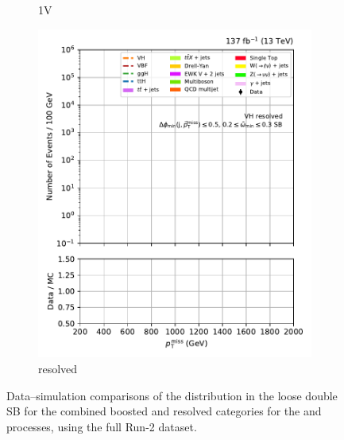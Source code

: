 \begin{figure}[htbp]
\begin{subfigure}[b]{0.24\textwidth}
        \caption{\VH 1V}
    \end{subfigure}
    \hfill
    \begin{subfigure}[b]{0.24\textwidth}
        \includegraphics[width=\textwidth]{figures/region_plots/full_Run2/sideband_1/VH_resolved.pdf}
        \caption{\VH resolved}
    \end{subfigure}
    \caption[Data--simulation comparisons of the \ptmiss distribution in the loose double sideband for the combined boosted and resolved categories for the \ttH and \VH processes, using the full Run-2 dataset]{Data--simulation comparisons of the \ptmiss distribution in the loose double \gls{SB} for the combined boosted and resolved categories for the \ttH and \VH processes, using the full Run-2 dataset.}
    \label{fig:htoinv_sb_yields_comb2016to18_loose_double}
\end{figure}
